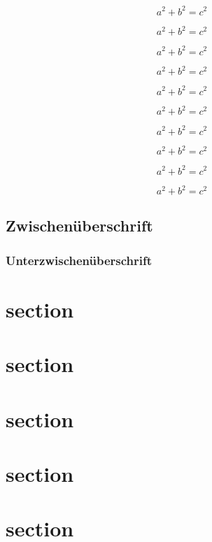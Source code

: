 \documentclass[ngerman]{scrartcl}
\begin{document}
	\begin{equation}
		a^2+b^2=c^2
	\end{equation}

	\begin{equation}
		a^2+b^2=c^2
	\end{equation}

	\begin{equation}
		a^2+b^2=c^2
	\end{equation}

	\begin{equation}
		a^2+b^2=c^2
	\end{equation}

	\begin{equation}
		a^2+b^2=c^2
	\end{equation}

	\begin{equation}
		a^2+b^2=c^2
	\end{equation}

	\begin{equation}
		a^2+b^2=c^2
	\end{equation}

	\begin{equation}
		a^2+b^2=c^2
	\end{equation}

	\begin{equation}
		a^2+b^2=c^2
	\end{equation}

	\begin{equation}
		a^2+b^2=c^2
	\end{equation}





	\lipsum[1-1]

	\subsection*{Zwischenüberschrift}

	\lipsum[1-1]

	\subsubsection*{Unterzwischenüberschrift}

	\lipsum[1-1]



	\section{section}
	\lipsum[1-5]

	\section{section}
	\lipsum[1-5]

	\section{section}
	\lipsum[1-5]

	\section{section}
	\lipsum[1-5]

	\section{section}
	\lipsum[1-25]
\end{document}

